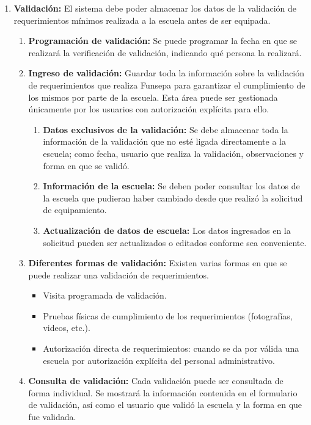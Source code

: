 \documentclass[11pt]{report}
\newcommand{\requisito}[2]{\textbf{#1:} #2}
\begin{document}
\begin{enumerate}[leftmargin=0.8cm]
		\item \requisito{Validación}{El sistema debe poder almacenar los datos de la validación de requerimientos mínimos realizada a la escuela antes de ser equipada.}
		\begin{enumerate}
			\item \requisito{Programación de validación}{Se puede programar la fecha en que se realizará la verificación de validación, indicando qué persona la realizará.}
			\item \requisito{Ingreso de validación}{Guardar toda la información sobre la validación de requerimientos que realiza Funsepa para garantizar el cumplimiento de los mismos por parte de la escuela. Esta área puede ser gestionada únicamente por los usuarios con autorización explícita para ello.}
			\begin{enumerate}
				\item \requisito{Datos exclusivos de la validación}{Se debe almacenar toda la información de la validación que no esté ligada directamente a la escuela; como fecha, usuario que realiza la validación, observaciones y forma en que se validó.}
				\item \requisito{Información de la escuela}{Se deben poder consultar los datos de la escuela que pudieran haber cambiado desde que realizó la solicitud de equipamiento.}
				\item \requisito{Actualización de datos de escuela}{Los datos ingresados en la solicitud pueden ser actualizados o editados conforme sea conveniente.}
			\end{enumerate}
			\item \requisito{Diferentes formas de validación}{Existen varias formas en que se puede realizar una validación de requerimientos.
				\begin{itemize}
					\item Visita programada de validación.
					\item Pruebas físicas de cumplimiento de los requerimientos (fotografías, videos, etc.).
					\item Autorización directa de requerimientos: cuando se da por válida una escuela por autorización explícita del personal administrativo.
				\end{itemize}
			}
			\item \requisito{Consulta de validación}{Cada validación puede ser consultada de forma individual. Se mostrará la información contenida en el formulario de validación, así como el usuario que validó la escuela y la forma en que fue validada.}

\end{enumerate}
\end{enumerate}
\end{document}
